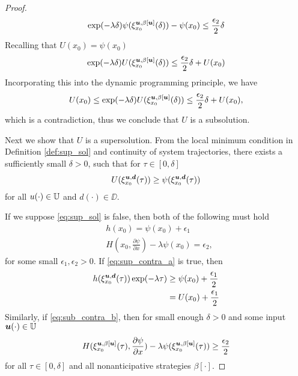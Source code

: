 \begin{for_journal}
\begin{proof}
%
\begin{equation}
\exp(-\lambda \delta)\psi(\xi_{x_0}^{\bm{u},\beta[\bm{u}]}(\delta))-\psi(x_0) \leq \frac{\epsilon_2}{2} \delta
\end{equation}
%
Recalling that $U(x_0)=\psi(x_0)$
%
\begin{equation}
\exp(-\lambda \delta)U(\xi_{x_0}^{\bm{u},\beta[\bm{u}]}(\delta)) \leq \frac{\epsilon_2}{2} \delta + U(x_0)
\end{equation}
%
Incorporating this into the dynamic programming principle, we have
%
\begin{equation}
U(x_0) \leq \exp(-\lambda \delta)U(\xi_{x_0}^{\bm{u},\beta[\bm{u}]}(\delta)) \leq \frac{\epsilon_2}{2} \delta + U(x_0),
\end{equation}
%
which is a contradiction, thus we conclude that $U$ is a subsolution.

Next we show that $U$ is a supersolution. From the local minimum condition in Definition \ref{def:sup_sol} and continuity of system trajectories, there exists a sufficiently small $\delta>0$, such that for $\tau \in [0, \delta]$
%
\begin{equation*}
U(\xi_{x_0}^{\bm{u}, \bm{d}}(\tau)) \geq \psi(\xi_{x_0}^{\bm{u}, \bm{d}}(\tau))
\end{equation*}
%
for all $u(\cdot) \in \mathbb{U}$ and $d(\cdot) \in \DD$.

If we suppose \eqref{eq:sup_sol} is false, then both of the following must hold 
%
\begin{subequations}
\begin{align}
&h(x_0) = \psi(x_0) + \epsilon_1 \label{eq:sup_contra_a}\\
&H(x_0,\frac{\partial \psi}{\partial x}) - \lambda \psi(x_0) = \epsilon_2 \label{eq:sup_contra_b},
\end{align} 
\end{subequations}
%
for some small $\epsilon_1, \epsilon_2 > 0$. If \eqref{eq:sup_contra_a} is true, then 
%
\begin{equation}
\begin{split}
h(\xi_{x_0}^{\bm{u}, \bm{d}}(\tau))\exp(-\lambda \tau) &\geq \psi(x_0) + \frac{\epsilon_1}{2} \\ &= U(x_0) + \frac{\epsilon_1}{2}
\end{split}
\end{equation}
%
Similarly, if \eqref{eq:sub_contra_b}, then for small enough $\delta>0$ and  some input $\bm{u}(\cdot) \in \mathbb{U}$ 
%
\begin{equation}
H(\xi_{x_0}^{\bm{u},\beta[\bm{u}]}(\tau), \frac{\partial \psi}{\partial x}) - \lambda \psi(\xi_{x_0}^{\bm{u},\beta[\bm{u}]}(\tau)) \geq \frac{\epsilon_2}{2}
\end{equation}
%
for all $\tau \in [0,\delta]$ and all nonanticipative strategies $\beta[\cdot]$. 


\end{proof}
\end{for_journal}
